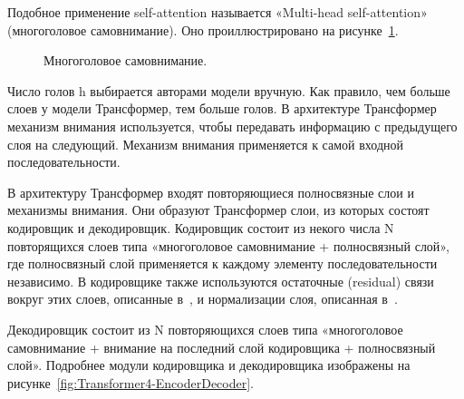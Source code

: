 Подобное применение self-attention называется «Multi-head self-attention» (многоголовое самовнимание). Оно проиллюстрировано на рисунке~\ref{fig:Transformer2-MultiHeadSelfAttention}.



\begin{figure}[ht]
 \caption{Многоголовое самовнимание.}\label{fig:Transformer2-MultiHeadSelfAttention}
\end{figure}


Число голов h выбирается авторами модели вручную. Как правило, чем больше слоев у модели Трансформер, тем больше голов. 
В архитектуре Трансформер механизм внимания используется, чтобы передавать информацию с предыдущего слоя на следующий. Механизм внимания применяется к самой входной последовательности.


В архитектуру Трансформер входят повторяющиеся полносвязные слои и механизмы внимания. Они образуют Трансформер слои, из которых состоят кодировщик и декодировщик. Кодировщик состоит из некого числа N повторящихся слоев типа «многоголовое самовнимание + полносвязный слой», где полносвязный слой применяется к каждому элементу последовательности независимо. В кодировщике также используются остаточные (residual) связи вокруг этих слоев, описанные в~\cite{he_2016}, и нормализации слоя, описанная в~\cite{ba_2016}.

Декодировщик состоит из N повторяющихся слоев типа «многоголовое самовнимание + внимание на последний слой кодировщика + полносвязный слой». 
 Подробнее модули кодировщика и декодировщика изображены на рисунке~\ref{fig:Transformer4-EncoderDecoder}. 

